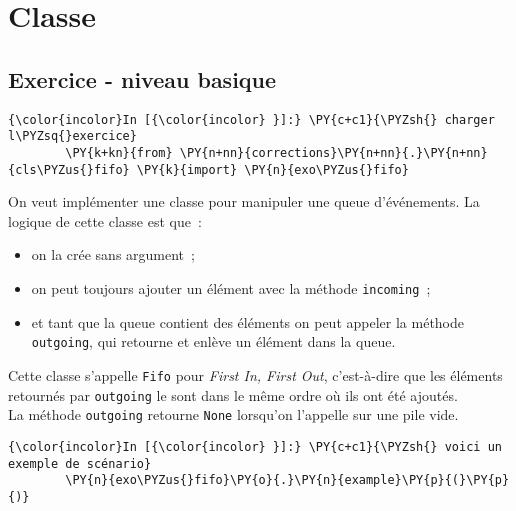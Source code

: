     \hypertarget{classe}{%
\section{Classe}\label{classe}}

    \hypertarget{exercice---niveau-basique}{%
\subsection{Exercice - niveau basique}\label{exercice---niveau-basique}}

    \begin{Verbatim}[commandchars=\\\{\}]
{\color{incolor}In [{\color{incolor} }]:} \PY{c+c1}{\PYZsh{} charger l\PYZsq{}exercice}
        \PY{k+kn}{from} \PY{n+nn}{corrections}\PY{n+nn}{.}\PY{n+nn}{cls\PYZus{}fifo} \PY{k}{import} \PY{n}{exo\PYZus{}fifo}
\end{Verbatim}


    On veut implémenter une classe pour manipuler une queue d'événements. La
logique de cette classe est que~:

\begin{itemize}
	\item 
	on la crée sans argument~;
	\item
	on peut toujours ajouter un élément avec la méthode \texttt{incoming}~;
	\item
	et tant que la queue contient des éléments on peut appeler la méthode
	\texttt{outgoing}, qui retourne et enlève un élément dans la queue.
\end{itemize}

Cette classe s'appelle \texttt{Fifo} pour \emph{First In, First Out},
c'est-à-dire que les éléments retournés par \texttt{outgoing} le sont
dans le même ordre où ils ont été ajoutés.\\

La méthode \texttt{outgoing} retourne \texttt{None} lorsqu'on l'appelle
sur une pile vide.

    \begin{Verbatim}[commandchars=\\\{\}]
{\color{incolor}In [{\color{incolor} }]:} \PY{c+c1}{\PYZsh{} voici un exemple de scénario}
        \PY{n}{exo\PYZus{}fifo}\PY{o}{.}\PY{n}{example}\PY{p}{(}\PY{p}{)}
\end{Verbatim}


